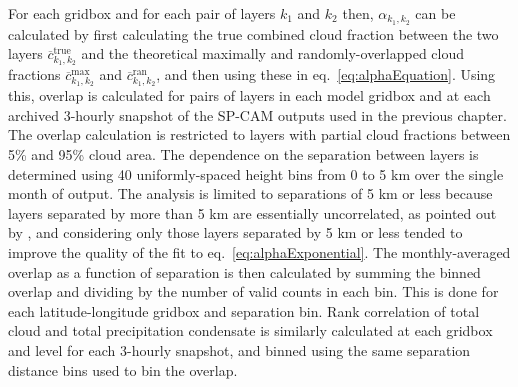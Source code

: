 For each gridbox and for each pair of layers \(k_1\) and \(k_2\) then,
\(\alpha_{k_1, k_2}\) can be calculated by first calculating the true
combined cloud fraction between the two layers
\(\overline{c}^\textrm{true}_{k_1, k_2}\) and the theoretical maximally
and randomly-overlapped cloud fractions
\(\overline{c}^\textrm{max}_{k_1, k_2}\) and
\(\overline{c}^\textrm{ran}_{k_1, k_2}\), and then using these in
eq.~\ref{eq:alphaEquation}. Using this, overlap is calculated for pairs
of layers in each model gridbox and at each archived 3-hourly snapshot
of the SP-CAM outputs used in the previous chapter. The overlap
calculation is restricted to layers with partial cloud fractions between
5\% and 95\% cloud area. The dependence on the separation between layers
is determined using 40 uniformly-spaced height bins from 0 to 5 km over
the single month of output. The analysis is limited to separations of 5
km or less because layers separated by more than 5 km are essentially
uncorrelated, as pointed out by \citet{pincus_et_al_2005}, and
considering only those layers separated by 5 km or less tended to
improve the quality of the fit to eq.~\ref{eq:alphaExponential}. The
monthly-averaged overlap as a function of separation is then calculated
by summing the binned overlap and dividing by the number of valid counts
in each bin. This is done for each latitude-longitude gridbox and
separation bin. Rank correlation of total cloud and total precipitation
condensate is similarly calculated at each gridbox and level for each
3-hourly snapshot, and binned using the same separation distance bins
used to bin the overlap.

